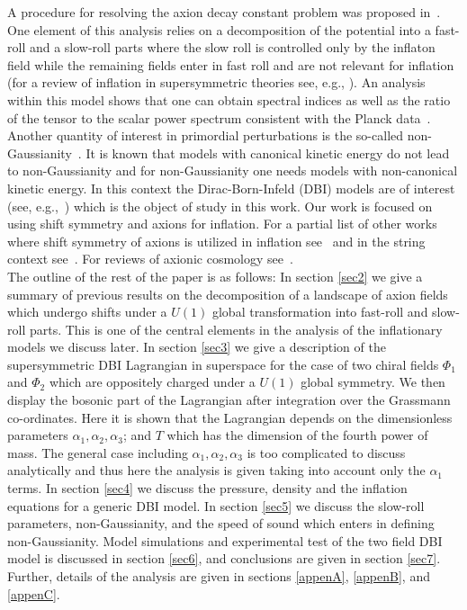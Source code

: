 \documentclass[a4paper,11pt]{article}
\begin{document}
  A procedure for resolving the axion decay constant problem was proposed in~\cite{Nath:2017ihp}.
  One element of this analysis relies on a
  decomposition of the potential into a fast-roll and a slow-roll parts where the slow roll is controlled only by the inflaton field while the remaining fields enter in fast roll and are not relevant for
  inflation~\cite{Nath:2017ihp} (for a review of inflation in supersymmetric theories see, e.g., \cite{Nath:2016qzm}).
  An analysis within this model shows that one can obtain
  spectral indices as well as the ratio of the tensor to the scalar power spectrum consistent with the Planck data~\cite{Adam:2015rua,Ade:2015lrj,Array:2015xqh}.
  Another quantity of interest in primordial perturbations is the so-called non-Gaussianity~\cite{Maldacena:2002vr,Seery:2005wm,Seery:2005gb,Chen:2005fe,Chen:2006nt,Lyth:2005fi}. It is known that models
  with canonical kinetic energy do not lead to non-Gaussianity and for non-Gaussianity one needs models
  with non-canonical kinetic energy. In this context the Dirac-Born-Infeld (DBI) models are of interest (see, e.g.,~\cite{Alishahiha:2004eh,Easson:2007dh,Huang:2007hh,Gordon:2000hv,Langlois:2008wt}) which is the object of study in this work.
  Our work is focused on using shift symmetry and axions for inflation. For a partial list of other works where
  shift symmetry of axions is utilized in inflation
  see~\cite{ArkaniHamed:2003mz,Kaplan:2003aj,Green:2009ds,Higaki:2014pja,Higaki:2014mwa,Kadota:2016jlw,Kobayashi:2016vcx}
  and in the string context see~\cite{Kachru:2003sx,BlancoPillado:2004ns,Cicoli:2016olq}.
  For reviews of axionic cosmology see~\cite{Pajer:2013fsa,Marsh:2015xka}.\\


  The outline of the rest of the paper is as follows: In section \ref{sec2} we
  give a summary of previous results on the decomposition of a landscape of axion fields which undergo shifts
  under a $U(1)$ global transformation into fast-roll and slow-roll parts.
  This is one of the central elements in the
  analysis of the inflationary models we discuss later.
  In section \ref{sec3} we give a description of the supersymmetric DBI Lagrangian
  in superspace for the case of two chiral fields $\Phi_1$ and $\Phi_2$ which are oppositely charged under a $U(1)$ global symmetry.
  We then display the bosonic part of the Lagrangian after integration over the Grassmann co-ordinates.
  Here it is shown that the Lagrangian depends on the dimensionless parameters $\alpha_1, \alpha_2, \alpha_3$; and $T$
  which has the dimension of the fourth power of mass. The general case including $\alpha_1, \alpha_2, \alpha_3$
  is too complicated to discuss analytically and thus here the analysis is given taking into account only the $\alpha_1$ terms.
  In section \ref{sec4} we discuss the pressure, density and the inflation equations for a generic DBI model. In section \ref{sec5} we
  discuss the slow-roll parameters, non-Gaussianity, and the speed of sound which enters in defining non-Gaussianity.
  Model simulations and 
  experimental test of the two field DBI model is discussed in section \ref{sec6}, and conclusions are given in section \ref{sec7}.
  Further, details of the analysis are given in sections \ref{appenA}, \ref{appenB}, and \ref{appenC}.
 
\end{document}
